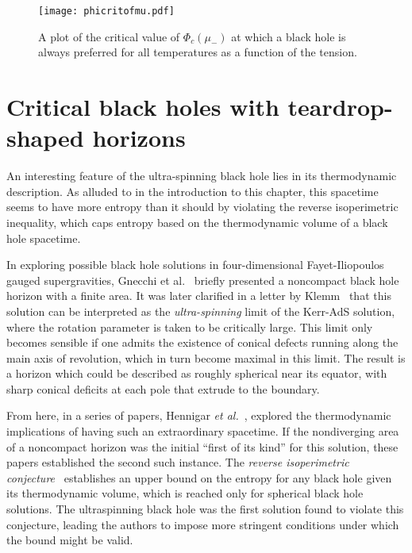 \documentclass[
twoside,
openright,
frontopenright,
]{dmathesis}
\begin{document}
\begin{figure} 
  \centering
  \texttt{[image: phicritofmu.pdf]}
  \caption{\label{fig:phicrit}A plot of the critical value of $\Phi_c(\mu_-)$ at
    which a black hole is always preferred for all temperatures as a function of
    the tension.}
\end{figure}


\section{Critical black holes with teardrop-shaped horizons}
\label{chap:crit-bh}

An interesting feature of the ultra-spinning black hole lies in its
thermodynamic description. As alluded to in the introduction to this chapter,
this spacetime seems to have more entropy than it should by violating the
reverse isoperimetric inequality, which caps entropy based on the thermodynamic
volume of a black hole spacetime. 

In exploring possible black hole solutions in four-dimensional Fayet-Iliopoulos
gauged supergravities, Gnecchi et al.~\cite{Gnecchi:2013mja} briefly presented a
noncompact black hole horizon with a finite area. It was later clarified in a
letter by Klemm~\cite{Klemm:2014rda} that this solution can be interpreted as
the \emph{ultra-spinning} limit of the Kerr-AdS solution, where the rotation
parameter is taken to be critically large. This limit only becomes sensible if
one admits the existence of conical defects running along the main axis of
revolution, which in turn become maximal in this limit. The result is a horizon
which could be described as roughly spherical near its equator, with sharp
conical deficits at each pole that extrude to the boundary.

From here, in a series of papers, Hennigar \emph{et
  al.}~\cite{Hennigar:2015gan,Hennigar:2014cfa,Hennigar:2015cja}, explored the
thermodynamic implications of having such an extraordinary spacetime. If the
nondiverging area of a noncompact horizon was the initial ``first of its
kind'' for this solution, these papers established the second such instance. The
\emph{reverse isoperimetric conjecture}~\cite{Dolan:2013ft,Cvetic:2010jb}
establishes an upper bound on the entropy for any black hole given its
thermodynamic volume, which is reached only for spherical black hole
solutions. The ultraspinning black hole was the first solution found to violate
this conjecture, leading the authors to impose more stringent conditions under
which the bound might be valid.
\end{document}
